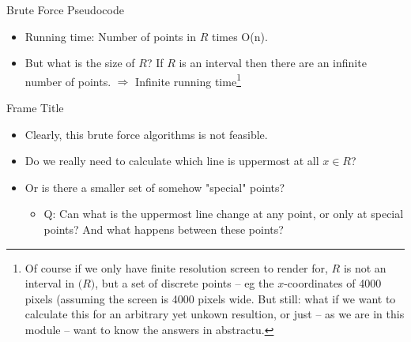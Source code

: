 \documentclass[ignorenonframetext,]{beamer}
\begin{document}
\begin{frame}{Brute Force Pseudocode}

\begin{algorithm}[H]
\caption{Removing Hidden Surfaces Brute Force}
\begin{algorithmic}
     
     
    \EndFor
    \EndFor
    \EndProcedure
\end{algorithmic}
\end{algorithm}
\begin{itemize}
    \item Running time: Number of points in $R$ times O(n).
    \item But what is the size of $R$? If $R$ is an interval then there are an infinite number of points. $\Rightarrow$ Infinite running time\footnote{Of course if we only have finite resolution screen to render for, $R$ is not an interval in $\mathbf(R)$, but a set of discrete points -- eg the $x$-coordinates of 4000 pixels (assuming the screen is 4000 pixels wide. But still: what if we want to calculate this for an arbitrary yet unkown resultion, or just -- as we are in this module -- want to know the answers in abstractu.}
\end{itemize}
\end{frame}

\begin{frame}{Frame Title}
    \begin{itemize}
        \item Clearly, this brute force algorithms is not feasible.
        \item Do we really need to calculate which line is uppermost at all $x \in R$?
        \item Or is there a smaller set of somehow "special" points?
        \begin{itemize}
            \item Q: Can what is the uppermost line change at any point, or only at special points? And what happens between these points?
        \end{itemize}
    \end{itemize}
\end{frame}
\end{document}
